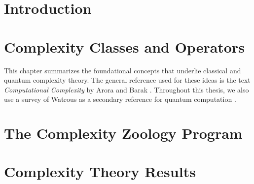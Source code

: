    \chapter{Introduction}
   
   

   \chapter{Complexity Classes and Operators}
   
   This chapter summarizes the foundational concepts that underlie classical 
   and quantum complexity theory. The general reference used for these ideas is
   the text \textit{Computational Complexity} by Arora and Barak 
   \cite{arora2009computational}. Throughout this thesis, we also use a survey 
   of Watrous as a secondary reference for quantum computation 
   \cite{watrous2009quantum}.

   
   

   \chapter{The Complexity Zoology Program}
   
   
   
   
   
   
   
   

   \chapter{Complexity Theory Results}

   
   
   
   
   
   
   
   
   
   \backmatter
   
   \nocite{*}
   
   
   

